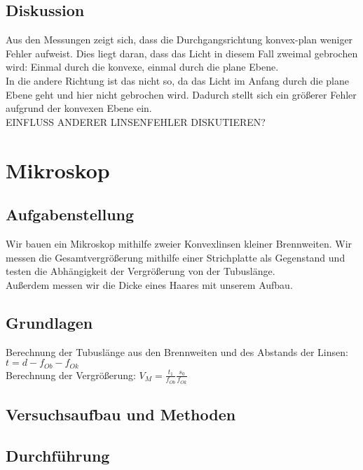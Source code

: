 \documentclass{article}
\begin{document}
\subsection{Diskussion}
Aus den Messungen zeigt sich, dass die Durchgangsrichtung konvex-plan weniger Fehler aufweist. Dies liegt daran, dass das Licht in diesem Fall zweimal gebrochen wird: Einmal durch die konvexe, einmal durch die plane Ebene. \\
In die andere Richtung ist das nicht so, da das Licht im Anfang durch die plane Ebene geht und hier nicht gebrochen wird. Dadurch stellt sich ein größerer Fehler aufgrund der konvexen Ebene ein. \\

EINFLUSS ANDERER LINSENFEHLER DISKUTIEREN?

\section{Mikroskop}

\subsection{Aufgabenstellung}
Wir bauen ein Mikroskop mithilfe zweier Konvexlinsen kleiner Brennweiten. Wir messen die Gesamtvergrößerung mithilfe einer Strichplatte als Gegenstand und testen die Abhängigkeit der Vergrößerung von der Tubuslänge. \\
Außerdem messen wir die Dicke eines Haares mit unserem Aufbau.
\subsection{Grundlagen}
Berechnung der Tubuslänge aus den Brennweiten und des Abstands der Linsen: $t=d-f_{Ob}-f_{Ok}$\\
Berechnung der Vergrößerung: $V_M=\frac{t_1}{f_{Ob}}\frac{s_0}{f_{Ok}}$
\subsection{Versuchsaufbau und Methoden}
\subsection{Durchführung}
\end{document}
